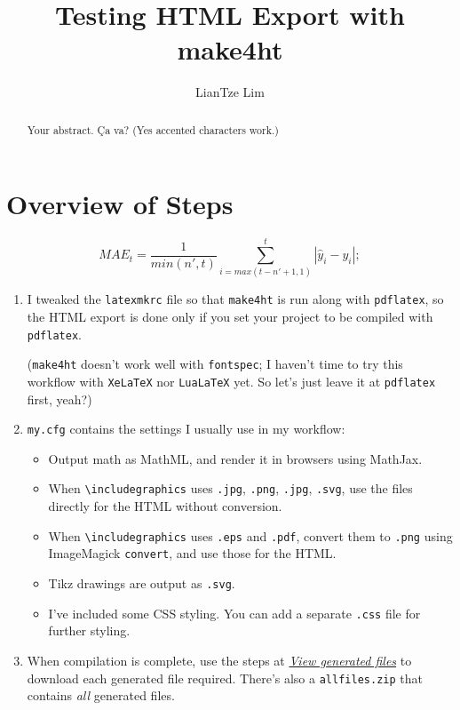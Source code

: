\documentclass[a4paper,11pt]{article}
\title{Testing HTML Export with make4ht}
\author{LianTze Lim}
\date{}
\begin{document}
\maketitle

\begin{abstract}
Your abstract. Ça va? (Yes accented characters work.)
\end{abstract}

\section{Overview of Steps}

\begin{equation}
MAE_t = \frac{1}{min(n',t)} \sum_{i=max(t-n'+1,1)}^{t}  | \hat{y}_i - y_i |; 
\end{equation}

\begin{enumerate}
\item I tweaked the \verb|latexmkrc| file so that \verb|make4ht| is run along with \verb|pdflatex|, so the HTML export is done only if you set your project to be compiled with \verb|pdflatex|.

(\verb|make4ht| doesn't work well with \verb|fontspec|; I haven't time to try this workflow with \verb|XeLaTeX| nor \verb|LuaLaTeX| yet. So let's just leave it at \verb|pdflatex| first, yeah?)

\item \verb|my.cfg| contains the settings I usually use in my workflow:
  \begin{itemize}
  \item Output math as MathML, and render it in browsers using MathJax.
  \item When \verb|\includegraphics| uses \verb|.jpg|, \verb|.png|, \verb|.jpg|, \verb|.svg|, use the files directly for the HTML without conversion.
  \item When \verb|\includegraphics| uses \verb|.eps| and \verb|.pdf|, convert them to \verb|.png| using ImageMagick \verb|convert|, and use those for the HTML.

  \item Tikz drawings are output as \verb|.svg|.
  
  \item I've included some CSS styling. You can add a separate \verb|.css| file for further styling.
  \end{itemize}
  
\item When compilation is complete, use the steps at \href{https://www.overleaf.com/learn/how-to/View_generated_files}{\emph{View generated files}} to download each generated file required. There's also a \texttt{allfiles.zip} that contains \emph{all} generated files.
\end{enumerate}
\end{document}
